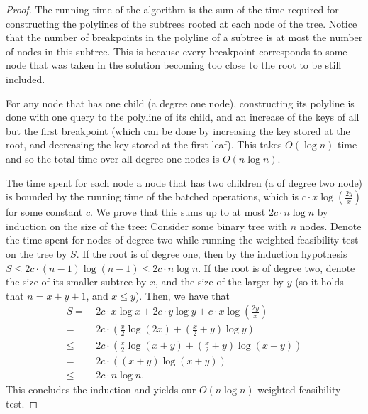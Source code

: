 \documentclass[a4paper,UKenglish]{lipics-v2016}
\theoremstyle{plain}
\begin{document}
\begin{proof}The running time of the algorithm is the sum of the time required for constructing the polylines of the subtrees rooted at each node of the tree.
%
Notice that the number of breakpoints in the polyline of a subtree is at most the number of nodes in this subtree. This is because every breakpoint corresponds to some node that was taken in the solution becoming too close to the root to be still included.

For any node that has one child (a degree one node), constructing its polyline is done with one query to the polyline of its child, and an increase of the keys of all but the first breakpoint (which can be done by increasing the key stored at the root, and decreasing the key stored at the first leaf). This takes $O(\log n)$ time and so the total time over all degree one nodes is $O(n \log n)$.
 
The time spent for each node a node that has two children (a of degree two node) is bounded by the running time of the batched operations, which is $c\cdot x \log (\frac{2y}{x})$ for some constant $c$. We prove that this sums up to at most $2c \cdot n \log n$ by induction on the size of the  tree: Consider some binary tree with $n$ nodes. Denote the time spent for nodes of degree two while running the weighted feasibility test on the tree by $S$. If the root is of degree one, then by the induction hypothesis $S \leq 2c\cdot (n-1)\log(n-1)\leq 2c\cdot n \log n$. If the root is of degree two, denote the size of its smaller subtree by $x$, and the size of the larger by $y$ (so it holds that $n=x+y+1$, and $x \leq y$). Then, we have that
\begin{align*}
S = & \ 2c\cdot x \log x + 2c\cdot y \log y + c\cdot x \log (\frac{2y}{x})\\
= & \ 2c\cdot (\frac{x}{2}\log(2x)+(\frac{x}{2}+y)\log y) \\
\leq & \ 2c\cdot (\frac{x}{2}\log(x+y)+(\frac{x}{2}+y)\log (x+y)) \\
= & \ 2c\cdot ((x+y)\log(x+y)) \\
\leq & \ 2c\cdot n \log n.
\end{align*}
This concludes the induction and yields our $O(n \log n)$ weighted feasibility test.
\end{proof}
\end{document}
